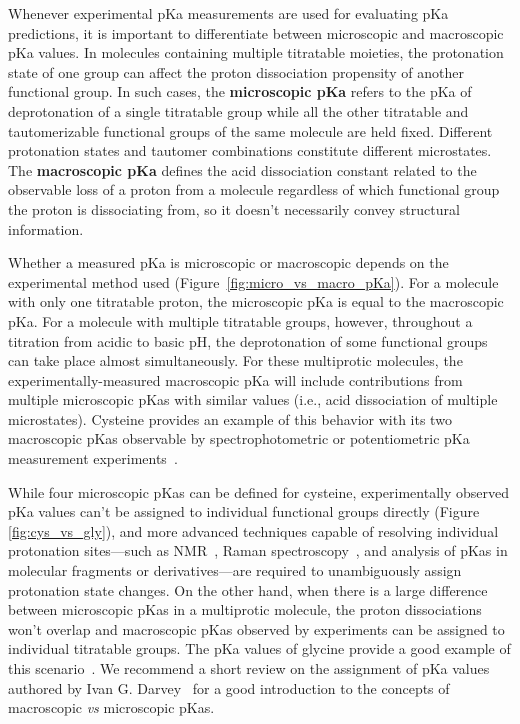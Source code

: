 \documentclass[9pt,lineno]{elife}
\begin{document}
Whenever experimental pKa measurements are used for evaluating pKa predictions, it is important to differentiate between microscopic and macroscopic pKa values. 
In molecules containing multiple titratable moieties, the protonation state of one group can affect the proton dissociation propensity of another functional group.
In such cases, the \textbf{microscopic pKa} refers to the pKa of deprotonation of a single titratable group while all the other titratable and tautomerizable functional groups of the same molecule are held fixed. 
Different protonation states and tautomer combinations constitute different microstates. 
The \textbf{macroscopic pKa} defines the acid dissociation constant related to the observable loss of a proton from a molecule regardless of which functional group the proton is dissociating from, so it doesn't necessarily convey structural information. 

Whether a measured pKa is microscopic or macroscopic depends on the experimental method used (Figure~\ref{fig:micro_vs_macro_pKa}). 
For a molecule with only one titratable proton, the microscopic pKa is equal to the macroscopic pKa. 
For a molecule with multiple titratable groups, however, throughout a titration from acidic to basic pH, the deprotonation of some functional groups can take place almost simultaneously. 
For these multiprotic molecules, the experimentally-measured macroscopic pKa will include contributions from multiple microscopic pKas with similar values (i.e., acid dissociation of multiple microstates). 
Cysteine provides an example of this behavior with its two macroscopic pKas observable by spectrophotometric or potentiometric pKa measurement experiments~\citep{bodner_assigning_1986,darvey_assignment_1995}. 

While four microscopic pKas can be defined for cysteine, experimentally observed pKa values can't be assigned to individual functional groups directly (Figure \ref{fig:cys_vs_gly}), and more advanced techniques capable of resolving individual protonation sites---such as NMR~\citep{bezencon_pka_2014}, Raman spectroscopy~\citep{elson_raman_1962, elbagerma_raman_2011}, and analysis of pKas in molecular fragments or derivatives---are required to unambiguously assign protonation state changes. 
On the other hand, when there is a large difference between microscopic pKas in a multiprotic molecule, the proton dissociations won't overlap and macroscopic pKas observed by experiments can be assigned to individual titratable groups. 
The pKa values of glycine provide a good example of this scenario~\citep{bodner_assigning_1986,elson_raman_1962,darvey_assignment_1995}. 
We recommend a short review on the assignment of pKa values authored by Ivan G. Darvey~\citep{darvey_assignment_1995} for a good introduction to the concepts of macroscopic \emph{vs} microscopic pKas.
\end{document}
